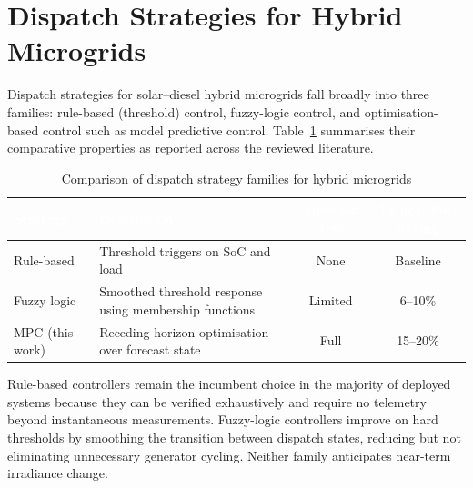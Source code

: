\section{Dispatch Strategies for Hybrid Microgrids}
Dispatch strategies for solar--diesel hybrid microgrids fall broadly into three families:
rule-based (threshold) control, fuzzy-logic control, and optimisation-based control such as
model predictive control. Table~\ref{tab:strategies} summarises their comparative properties
as reported across the reviewed literature.

\begin{table}[h]
\centering
\caption{Comparison of dispatch strategy families for hybrid microgrids}
\label{tab:strategies}
\begin{tabularx}{\textwidth}{@{}l X c c@{}}
\toprule
\rowcolor{uctblue}
\textcolor{white}{\textbf{Strategy}} & \textcolor{white}{\textbf{Description}} &
\textcolor{white}{\textbf{Forecast Use}} & \textcolor{white}{\textbf{Typical Fuel Saving}} \\
\midrule
Rule-based & Threshold triggers on SoC and load & None & Baseline \\
Fuzzy logic & Smoothed threshold response using membership functions & Limited & 6--10\% \\
MPC (this work) & Receding-horizon optimisation over forecast state & Full & 15--20\% \\
\bottomrule
\end{tabularx}
\end{table}

Rule-based controllers remain the incumbent choice in the majority of deployed systems because
they can be verified exhaustively and require no telemetry beyond instantaneous
measurements. Fuzzy-logic controllers improve on hard thresholds by smoothing the transition
between dispatch states, reducing but not eliminating unnecessary generator cycling. Neither
family anticipates near-term irradiance change.
